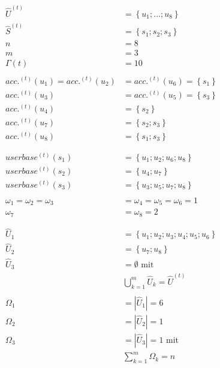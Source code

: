 \begin{parcolumns}[rulebetween=true]{2}
{\begin{align*}
\widehat{U}^{(t)} &= \left\{ u_1;...; u_8 \right\} \\
\widehat{S}^{(t)} &= \left\{ s_1; s_2; s_3 \right\} \\
n &= 8 \\
m &= 3 \\
\Gamma(t) &= 10 \\
\textrm{ } \\
acc.^{(t)}(u_1) = acc.^{(t)}(u_2) &= acc.^{(t)}(u_6) = \left\{ s_1 \right\} \\
acc.^{(t)}(u_3) &= acc.^{(t)}(u_5) = \left\{ s_3 \right\} \\
acc.^{(t)}(u_4) &= \left\{ s_2 \right\} \\
acc.^{(t)}(u_7) &= \left\{ s_2; s_3 \right\} \\
acc.^{(t)}(u_8) &= \left\{ s_1; s_3 \right\} \\
\textrm{ } \\
\textrm{ } \\
userbase^{(t)}(s_1) &= \left\{ u_1; u_2; u_6; u_8 \right\} \\
userbase^{(t)}(s_2) &= \left\{ u_4; u_7 \right\} \\
userbase^{(t)}(s_3) &= \left\{ u_3; u_5; u_7; u_8 \right\} \\
\textrm{ } \\
\omega_1 = \omega_2 = \omega_3 &= \omega_4 = \omega_5 = \omega_6 = 1 \\
\omega_7 &= \omega_8 = 2 \\
\textrm{ } \\
\textrm{ } \\
\widehat{U}_1 &= \left\{ u_1; u_2; u_3; u_4; u_5; u_6 \right\} \\
\widehat{U}_2 &= \left\{ u_7; u_8 \right\} \\
\widehat{U}_3 &= \emptyset \textrm{  mit } \\
&\bigcup_{k=1}^{m} \widehat{U}_k = \widehat{U}^{(t)} \\
\textrm{ } \\
\Omega_1 &= \left| \widehat{U}_1 \right| = 6 \\
\Omega_2 &= \left| \widehat{U}_2 \right| = 1 \\
\Omega_3 &= \left| \widehat{U}_3 \right| = 1 \textrm{  mit } \\
&\sum_{k=1}^{m} \Omega_k = n \\
\textrm{ }
\end{align*}
      

}

\end{parcolumns}

